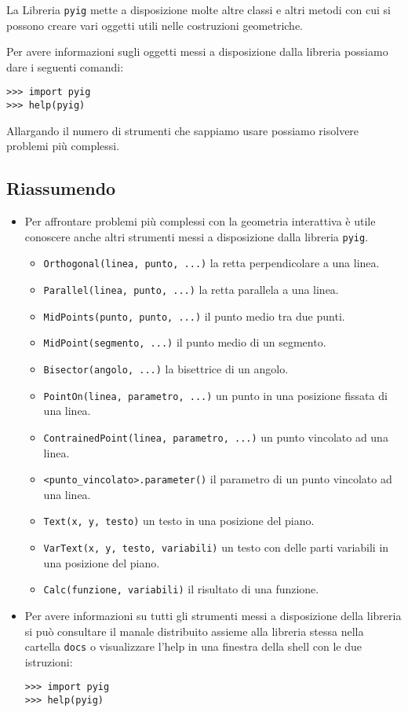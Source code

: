 La Libreria \lstinline{pyig} mette a disposizione molte altre classi e altri 
metodi con cui si possono creare vari oggetti utili nelle costruzioni 
geometriche. 

Per avere informazioni sugli oggetti messi a disposizione dalla libreria 
possiamo dare i seguenti comandi:
 \begin{lstlisting}[numbers=none]
>>> import pyig
>>> help(pyig)
 \end{lstlisting}

Allargando il numero di strumenti che sappiamo usare possiamo risolvere 
problemi più complessi.

\subsection{Riassumendo}
\begin{itemize} [noitemsep]
\item Per affrontare problemi più complessi con la geometria interattiva è 
utile conoscere anche altri strumenti messi a disposizione dalla libreria 
\lstinline{pyig}.
\begin{itemize} %
 \item \lstinline{Orthogonal(linea, punto, ...)} 
 la retta perpendicolare a una linea.
 \item \lstinline{Parallel(linea, punto, ...)} 
 la retta parallela a una linea.
 \item \lstinline{MidPoints(punto, punto, ...)} 
 il punto medio tra due punti.
 \item \lstinline{MidPoint(segmento, ...)} 
 il punto medio di un segmento.
 \item \lstinline{Bisector(angolo, ...)} 
 la bisettrice di un angolo.
 \item \lstinline{PointOn(linea, parametro, ...)} 
 un punto in una posizione fissata di una linea.
 \item \lstinline{ContrainedPoint(linea, parametro, ...)} 
 un punto vincolato ad una linea.
 \item \lstinline{<punto_vincolato>.parameter()} 
 il parametro di un punto vincolato ad una linea.
 \item \lstinline{Text(x, y, testo)} 
 un testo in una posizione del piano.
 \item \lstinline{VarText(x, y, testo, variabili)} 
 un testo con delle parti variabili in una posizione del piano.
 \item \lstinline{Calc(funzione, variabili)} 
 il risultato di una funzione.
\end{itemize}
\item Per avere informazioni su tutti gli strumenti messi a disposizione della 
libreria si può consultare il manale distribuito assieme alla libreria stessa 
nella cartella \lstinline{docs} o visualizzare l'help in una finestra della 
shell con le due istruzioni:
 \begin{lstlisting}[numbers=none]
>>> import pyig
>>> help(pyig)
 \end{lstlisting}
\end{itemize}

